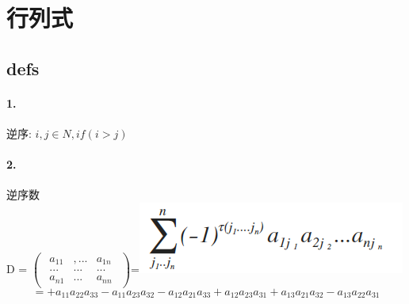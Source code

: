 \documentclass[printbox]{BHCexam}
\begin{document}
\tableofcontents

\clearpage




\section{行列式}
\subsection{defs}

\paragraph{1.} 逆序: $i,j \in N , if(i > j)  $
\paragraph{2.}  逆序数 \\
D = $\begin{pmatrix} \begin{matrix} a_{ 11 } & ,... & a_{ 1n } \\ ... & ... & ... \\ a_{ n1 } & ... & a_{ nn } \end{matrix} \end{pmatrix}$=\includegraphics[scale=0.5]{assets/1-1.png}
$$=+a_{11} a_{22} a_{33} -a_{11} a_{23} a_{32} -a_{12} a_{21} a_{33} +a_{12} a_{23} a_{31}
+a_{13} a_{21} a_{32} -a_{13} a_{22} a_{31}
$$ 
\end{document}
